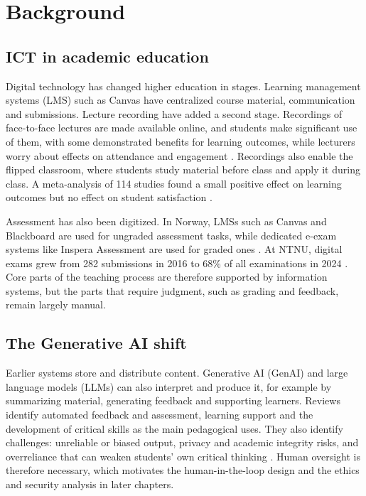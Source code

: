 

\section{Background}

\subsection{ICT in academic education}

Digital technology has changed higher education in stages. Learning management systems (LMS) such as Canvas have centralized course material, communication and submissions. Lecture recording have added a second stage. Recordings of face-to-face lectures are made available online, and students make significant use of them, with some demonstrated benefits for learning outcomes, while lecturers worry about effects on attendance and engagement \parencite{ocallaghan2017}. Recordings also enable the flipped classroom, where students study material before class and apply it during class. A meta-analysis of 114 studies found a small positive effect on learning outcomes but no effect on student satisfaction \parencite{vanalten2019}.

Assessment has also been digitized. In Norway, LMSs such as Canvas and Blackboard are used for ungraded assessment tasks, while dedicated e-exam systems like Inspera Assessment are used for graded ones \parencite{chirumamilla2021}. At NTNU, digital exams grew from 282 submissions in 2016 to 68\% of all examinations in 2024 \parencite{inspera2025}. Core parts of the teaching process are therefore supported by information systems, but the parts that require judgment, such as grading and feedback, remain largely manual.

\subsection{The Generative AI shift}

Earlier systems store and distribute content. Generative AI (GenAI) and large language models (LLMs) can also interpret and produce it, for example by summarizing material, generating feedback and supporting learners. Reviews identify automated feedback and assessment, learning support and the development of critical skills as the main pedagogical uses. They also identify challenges: unreliable or biased output, privacy and academic integrity risks, and overreliance that can weaken students' own critical thinking \parencite{qian2025}. Human oversight is therefore necessary, which motivates the human-in-the-loop design and the ethics and security analysis in later chapters.

